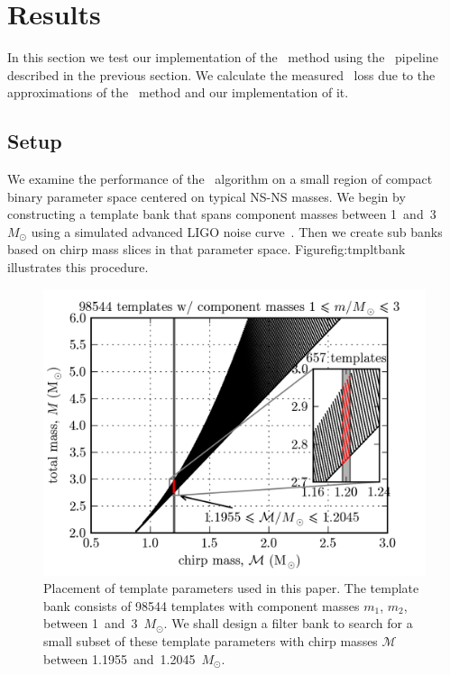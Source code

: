 \section{Results}
\label{SECIV}\label{sec:results}

In this section we test our implementation of the \lloid\ method using the \gstreamer\
pipeline described in the previous section.  We calculate the measured \SNR\
loss due to the approximations of the \lloid\ method and our implementation of
it.

\subsection{Setup}

We examine the performance of the \lloid\ algorithm on a small region of
compact binary parameter space centered on typical NS-NS masses.  We begin by
constructing a template bank that spans component masses between
1~and~3~$M_\odot$ using a simulated advanced LIGO noise curve~\cite{lal}.  Then
we create sub banks based on chirp mass slices in that parameter space.
Figure{fig:tmpltbank} illustrates this procedure.
\begin{figure}[htbp]
	\label{fig:tmpltbank}
	\begin{center}
		\includegraphics{figures/tmpltbank.png}
		\caption{Placement of template parameters used in this paper.  The template bank consists of 98544 templates with component masses $m_1$, $m_2$, between 1~and~3~$M_\odot$.  We shall design a filter bank to search for a small subset of these template parameters with chirp masses $\mathcal M$ between 1.1955~and~1.2045~$M_\odot$.}
	\end{center}
\end{figure}
